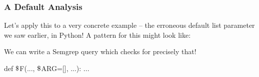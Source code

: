 \documentclass[aspectratio=169, handout]{beamer}
\newcommand{\dollar}{\mbox{\textdollar}}
\begin{document}
 \begin{frame}[fragile]
   \frametitle{A Default Analysis}

   Let's apply this to a very concrete example -- the erroneous default list parameter we
   saw earlier, in Python! A pattern for this might look like:

   \pause
   \vspace{\fill}

   We can write a Semgrep query which checks for precisely that!

   \pause
   \vspace{\fill}

   \begin{minipage}{0.45\textwidth}
    \begin{pythoncodeblock}
      def $\dollar$F(..., $\dollar$ARG=[], ...):
        ...
    \end{pythoncodeblock}
   \end{minipage}
   \pause
    \begin{minipage}{0.53\textwidth}
      \centering
    \end{minipage}
 \end{frame}
\end{document}
